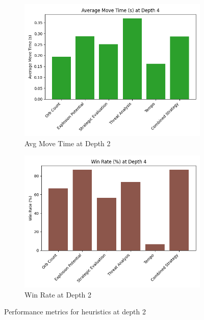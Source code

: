 \documentclass[12pt]{article}
\begin{document}
\begin{figure}[ht]
  \centering
  \begin{subfigure}[b]{0.45\textwidth}
    \includegraphics[width=\textwidth]{depth4_move_time.png}
    \caption{Avg Move Time at Depth 2}
    \label{fig:move2}
  \end{subfigure}
  \hfill
  \begin{subfigure}[b]{0.45\textwidth}
    \includegraphics[width=\textwidth]{depth4_win_rate.png}
    \caption{Win Rate at Depth 2}
    \label{fig:win2}
  \end{subfigure}
  \caption{Performance metrics for heuristics at depth 2}
  \label{fig:perf2}
\end{figure}
\end{document}
